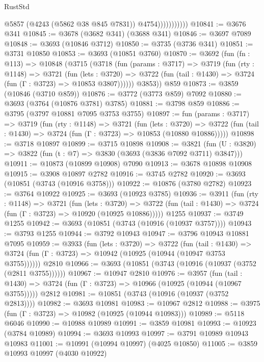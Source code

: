 \begin{lexlean}{RustStd}
\begin{coremodule}
                          @5857
                          (@4243 (@5862 @38 @845 @7831))
                          @4754)))))))))))
@10841 := @3676 @341
@10845 := @3678 (@3682 @341) (@3688 @341)
@10846 := @3697 @7089
@10848 := @3693 (@10846 @3712)
@10850 := @3735 (@3736 @341)
@10851 := @3731 @10850
@10853 := @3693 (@10851 @3760)
@10870 := @3692
    (fun (fn : @113) =>
    @10848
      (@3715
        (@3718
          (fun (params : @3717) =>
          @3719
            (fun (rty : @1148) =>
            @3721
              (fun (lets : @3720) =>
              @3722 (fun (tail : @1430) => @3724 (fun (Γ : @3723) => @10853 @3807))))))
        @3853))
    @859
@10873 := @3859 (@10846 (@3710 @859))
@10876 := @3772 (@3773 @859) @7092
@10880 := @3693 (@3764 (@10876 @3781) @3785)
@10881 := @3798 @859
@10886 := @3795 (@3797 @10881 @7095 @3753 @3755)
@10897 := fun (params : @3717) =>
  @3719
    (fun (rty : @1148) =>
    @3721
      (fun (lets : @3720) =>
      @3722 (fun (tail : @1430) => @3724 (fun (Γ : @3723) => @10853 (@10880 @10886)))))
@10898 := @3718 @10897
@10899 := @3715 @10898
@10908 := @3821 (fun (U : @3820) => @3822 (fun (t : @7) => @3830 (@3693 (@3836 @7092 @3711) @3847)))
@10911 := @10873 (@10899 @10908) @7090
@10913 := @3678 @10898 @10908
@10915 := @3908 @10897 @2782
@10916 := @3745 @2782
@10920 := @3693 (@10851 (@3743 (@10916 @3758)))
@10922 := @10876 (@3780 @2782)
@10923 := @3764 @10922
@10925 := @3693 (@10923 @3785)
@10936 := @3911
    (fun (rty : @1148) =>
    @3721
      (fun (lets : @3720) =>
      @3722 (fun (tail : @1430) => @3724 (fun (Γ : @3723) => @10920 (@10925 @10886)))))
    @1255
@10937 := @3749 @1255
@10942 := @3693 (@10851 (@3743 (@10916 (@10937 @3757))))
@10943 := @3793 @1255
@10944 := @3792 @10943
@10947 := @3796 @10943 @10881 @7095
@10959 := @3933
    (fun (lets : @3720) =>
    @3722
      (fun (tail : @1430) =>
      @3724 (fun (Γ : @3723) => @10942 (@10925 (@10944 (@10947 @3753 @3755))))))
    @2810
@10966 := @3693 (@10851 (@3743 (@10916 (@10937 (@3752 (@2811 @3755))))))
@10967 := @10947 @2810
@10976 := @3957
    (fun (tail : @1430) => @3724 (fun (Γ : @3723) => @10966 (@10925 (@10944 (@10967 @3755)))))
    @2812
@10981 := @10851 (@3743 (@10916 (@10937 (@3752 @2813))))
@10982 := @3693 @10981
@10983 := @10967 @2812
@10988 := @3975 (fun (Γ : @3723) => @10982 (@10925 (@10944 @10983)))
@10989 := @5118 @6046
@10990 := @10988 @10989
@10991 := @3859 @10981
@10993 := @10923 (@3784 @10989)
@10994 := @3693 @10993
@10997 := @3791 @10989 @10943 @10983
@11001 := @10991 (@10994 @10997) (@4025 @10850)
@11005 := @3859 @10993 @10997 (@4030 @10922)

\end{coremodule}
\end{lexlean}
